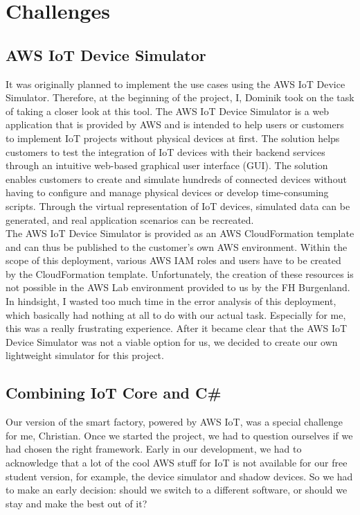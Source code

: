 \chapter{Challenges}

\section{AWS IoT Device Simulator}

It was originally planned to implement the use cases using the AWS IoT Device Simulator.
Therefore, at the beginning of the project, I, Dominik took on the task of taking a closer look at this tool.
The AWS IoT Device Simulator is a web application that is provided by AWS and is intended to help users or customers to implement IoT projects without physical devices at first. 
The solution helps customers to test the integration of IoT devices with their backend services through an intuitive web-based graphical user interface (GUI).
The solution enables customers to create and simulate hundreds of connected devices without having to configure and manage physical devices or develop time-consuming scripts.
Through the virtual representation of IoT devices, simulated data can be generated, and real application scenarios can be recreated.\\

The AWS IoT Device Simulator is provided as an AWS CloudFormation template and can thus be published to the customer's own AWS environment.
Within the scope of this deployment, various AWS IAM roles and users have to be created by the CloudFormation template.
Unfortunately, the creation of these resources is not possible in the AWS Lab environment provided to us by the FH Burgenland.
In hindsight, I wasted too much time in the error analysis of this deployment, which basically had nothing at all to do with our actual task.
Especially for me, this was a really frustrating experience.
After it became clear that the AWS IoT Device Simulator was not a viable option for us, we decided to create our own lightweight simulator for this project.

\section{Combining IoT Core and C\#}

Our version of the smart factory, powered by AWS IoT, was a special challenge for me, Christian.
Once we started the project, we had to question ourselves if we had chosen the right framework.
Early in our development, we had to acknowledge that a lot of the cool AWS stuff for IoT is not available for our free student version, for example, the device simulator and shadow devices.
So we had to make an early decision: should we switch to a different software, or should we stay and make the best out of it?

